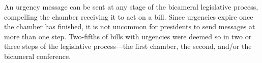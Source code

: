\documentclass[letter,12pt]{article}
\newcommand{\mc}{\multicolumn}
\begin{document}

An urgency message can be sent at any stage of the bicameral legislative process, compelling the chamber receiving it to act on a bill. Since urgencies expire once the chamber has finished, it is not uncommon for presidents to send messages at more than one step. Two-fifths of bills with urgencies were deemed so in two or three steps of the legislative process---the first chamber, the second, and/or the bicameral conference.    
\end{document}
